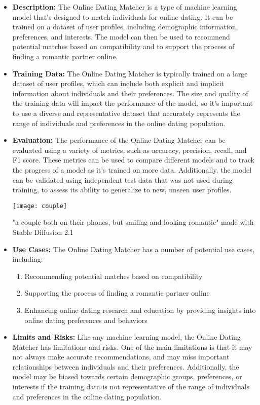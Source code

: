 \begin{itemize}
    \item \textbf{Description:} The Online Dating Matcher is a type of machine learning model that's designed to match individuals for online dating. It can be trained on a dataset of user profiles, including demographic information, preferences, and interests. The model can then be used to recommend potential matches based on compatibility and to support the process of finding a romantic partner online.
    \item \textbf{Training Data:} The Online Dating Matcher is typically trained on a large dataset of user profiles, which can include both explicit and implicit information about individuals and their preferences. The size and quality of the training data will impact the performance of the model, so it's important to use a diverse and representative dataset that accurately represents the range of individuals and preferences in the online dating population.
    \item \textbf{Evaluation:} The performance of the Online Dating Matcher can be evaluated using a variety of metrics, such as accuracy, precision, recall, and F1 score. These metrics can be used to compare different models and to track the progress of a model as it's trained on more data. Additionally, the model can be validated using independent test data that was not used during training, to assess its ability to generalize to new, unseen user profiles.
\begin{marginfigure}[-5.5cm]
        \texttt{[image: couple]}
        \caption{"a couple both on their phones, but smiling and looking romantic" made with Stable Diffusion 2.1}
\end{marginfigure}
    \item \textbf{Use Cases:} The Online Dating Matcher has a number of potential use cases, including:
        \begin{enumerate}  
            \item Recommending potential matches based on compatibility
            \item Supporting the process of finding a romantic partner online
            \item Enhancing online dating research and education by providing insights into online dating preferences and behaviors
        \end{enumerate}
    \item \textbf{Limits and Risks:} Like any machine learning model, the Online Dating Matcher has limitations and risks. One of the main limitations is that it may not always make accurate recommendations, and may miss important relationships between individuals and their preferences. Additionally, the model may be biased towards certain demographic groups, preferences, or interests if the training data is not representative of the range of individuals and preferences in the online dating population.

\end{itemize}
